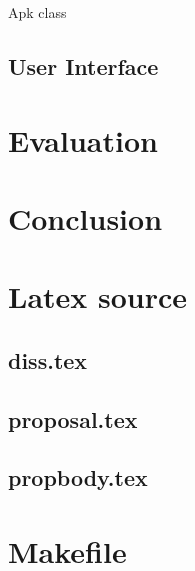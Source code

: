 \documentclass[12pt,twoside,notitlepage]{report}
\begin{document}
Apk class

\section{User Interface}



\cleardoublepage
\chapter{Evaluation}


\cleardoublepage
\chapter{Conclusion}



\cleardoublepage



\cleardoublepage

\appendix

\chapter{Latex source}

\section{diss.tex}
{\scriptsize}

\section{proposal.tex}
{\scriptsize}

\section{propbody.tex}
{\scriptsize}



\cleardoublepage

\chapter{Makefile}
\end{document}
